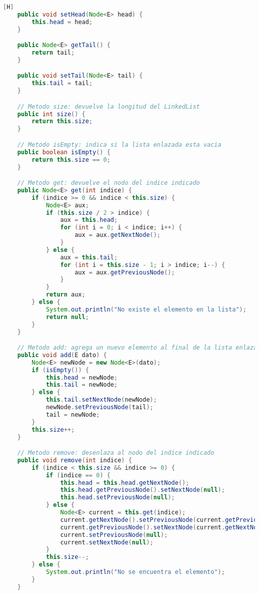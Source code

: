\begin{enumerate}[{Ejercicio} 1.]
\begin{lstlisting}[language=java, caption={DoubleLinkedList}][H]
    public void setHead(Node<E> head) {
        this.head = head;
    }

    public Node<E> getTail() {
        return tail;
    }

    public void setTail(Node<E> tail) {
        this.tail = tail;
    }

    // Metodo size: devuelve la longitud del LinkedList
    public int size() {
        return this.size;
    }

    // Metodo isEmpty: indica si la lista enlazada esta vacia
    public boolean isEmpty() {
        return this.size == 0;
    }

    // Metodo get: devuelve el nodo del indice indicado
    public Node<E> get(int indice) {
        if (indice >= 0 && indice < this.size) {
            Node<E> aux;
            if (this.size / 2 > indice) {
                aux = this.head;
                for (int i = 0; i < indice; i++) {
                    aux = aux.getNextNode();
                }
            } else {
                aux = this.tail;
                for (int i = this.size - 1; i > indice; i--) {
                    aux = aux.getPreviousNode();
                }
            }
            return aux;
        } else {
            System.out.println("No existe el elemento en la lista");
            return null;
        }
    }

    // Metodo add: agrega un nuevo elemento al final de la lista enlazada
    public void add(E dato) {
        Node<E> newNode = new Node<E>(dato);
        if (isEmpty()) {
            this.head = newNode;
            this.tail = newNode;
        } else {
            this.tail.setNextNode(newNode);
            newNode.setPreviousNode(tail);
            tail = newNode;
        }
        this.size++;
    }

    // Metodo remove: desenlaza al nodo del indice indicado
    public void remove(int indice) {
        if (indice < this.size && indice >= 0) {
            if (indice == 0) {
                this.head = this.head.getNextNode();
                this.head.getPreviousNode().setNextNode(null);
                this.head.setPreviousNode(null);
            } else {
                Node<E> current = this.get(indice);
                current.getNextNode().setPreviousNode(current.getPreviousNode());
                current.getPreviousNode().setNextNode(current.getNextNode());
                current.setPreviousNode(null);
                current.setNextNode(null);
            }
            this.size--;
        } else {
            System.out.println("No se encuentra el elemento");
        }
    }


\end{lstlisting}
\end{enumerate}
